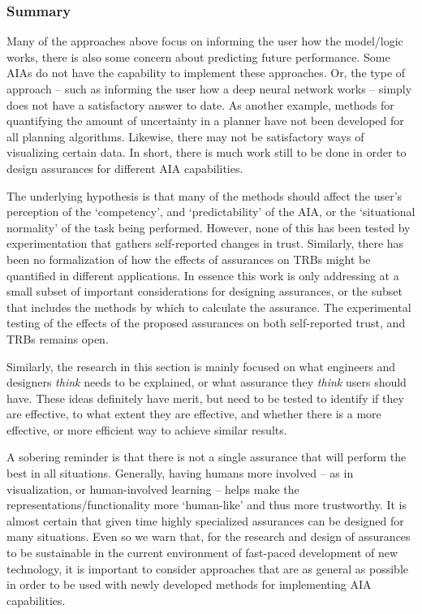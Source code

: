 \subsubsection{Summary}
Many of the approaches above focus on informing the user how the model/logic works, there is also some concern about predicting future performance. Some AIAs do not have the capability to implement these approaches. Or, the type of approach -- such as informing the user how a deep neural network works -- simply does not have a satisfactory answer to date. As another example, methods for quantifying the amount of uncertainty in a planner have not been developed for all planning algorithms. Likewise, there may not be satisfactory ways of visualizing certain data. In short, there is much work still to be done in order to design assurances for different AIA capabilities.

The underlying hypothesis is that many of the methods should affect the user's perception of the `competency', and `predictability' of the AIA, or the `situational normality' of the task being performed. However, none of this has been tested by experimentation that gathers self-reported changes in trust. Similarly, there has been no formalization of how the effects of assurances on TRBs might be quantified in different applications. In essence this work is only addressing at a small subset of important considerations for designing assurances, or the subset that includes the methods by which to calculate the assurance. The experimental testing of the effects of the proposed assurances on both self-reported trust, and TRBs remains open.

Similarly, the research in this section is mainly focused on what engineers and designers \emph{think} needs to be explained, or what assurance they \emph{think} users should have. These ideas definitely have merit, but need to be tested to identify if they are effective, to what extent they are effective, and whether there is a more effective, or more efficient way to achieve similar results.

A sobering reminder is that there is not a single assurance that will perform the best in all situations. Generally, having humans more involved -- as in visualization, or human-involved learning -- helps make the representations/functionality more `human-like' and thus more trustworthy. It is almost certain that given time highly specialized assurances can be designed for many situations. Even so we warn that, for the research and design of assurances to be sustainable in the current environment of fast-paced development of new technology, it is important to consider approaches that are as general as possible in order to be used with newly developed methods for implementing AIA capabilities.

